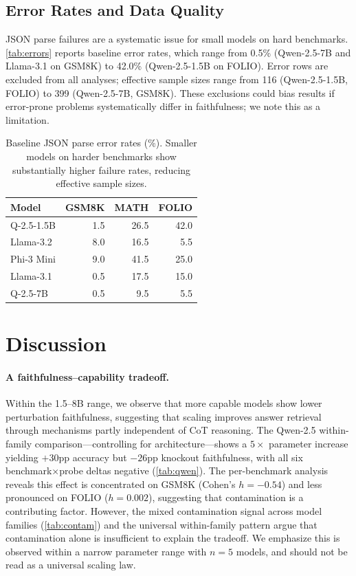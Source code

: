 \documentclass[11pt]{article}
\begin{document}
\subsection{Error Rates and Data Quality}
\label{sec:errors}

JSON parse failures are a systematic issue for small models on hard benchmarks. \autoref{tab:errors} reports baseline error rates, which range from 0.5\% (Qwen-2.5-7B and Llama-3.1 on GSM8K) to 42.0\% (Qwen-2.5-1.5B on FOLIO). Error rows are excluded from all analyses; effective sample sizes range from 116 (Qwen-2.5-1.5B, FOLIO) to 399 (Qwen-2.5-7B, GSM8K). These exclusions could bias results if error-prone problems systematically differ in faithfulness; we note this as a limitation.

\begin{table}[t]
\centering\small
\begin{tabular}{lrrr}
\toprule
\textbf{Model} & \textbf{GSM8K} & \textbf{MATH} & \textbf{FOLIO} \\
\midrule
Q-2.5-1.5B & 1.5 & 26.5 & 42.0 \\
Llama-3.2 & 8.0 & 16.5 & 5.5 \\
Phi-3 Mini & 9.0 & 41.5 & 25.0 \\
\midrule
Llama-3.1 & 0.5 & 17.5 & 15.0 \\
Q-2.5-7B & 0.5 & 9.5 & 5.5 \\
\bottomrule
\end{tabular}
\caption{Baseline JSON parse error rates (\%). Smaller models on harder benchmarks show substantially higher failure rates, reducing effective sample sizes.}
\label{tab:errors}
\end{table}

\section{Discussion}
\label{sec:discussion}

\paragraph{A faithfulness--capability tradeoff.} Within the 1.5--8B range, we observe that more capable models show lower perturbation faithfulness, suggesting that scaling improves answer retrieval through mechanisms partly independent of CoT reasoning. The Qwen-2.5 within-family comparison---controlling for architecture---shows a $5\times$ parameter increase yielding $+30$pp accuracy but $-26$pp knockout faithfulness, with all six benchmark$\times$probe deltas negative (\autoref{tab:qwen}). The per-benchmark analysis reveals this effect is concentrated on GSM8K (Cohen's $h{=}{-}0.54$) and less pronounced on FOLIO ($h{=}0.002$), suggesting that contamination is a contributing factor. However, the mixed contamination signal across model families (\autoref{tab:contam}) and the universal within-family pattern argue that contamination alone is insufficient to explain the tradeoff. We emphasize this is observed within a narrow parameter range with $n{=}5$ models, and should not be read as a universal scaling law.
\end{document}

